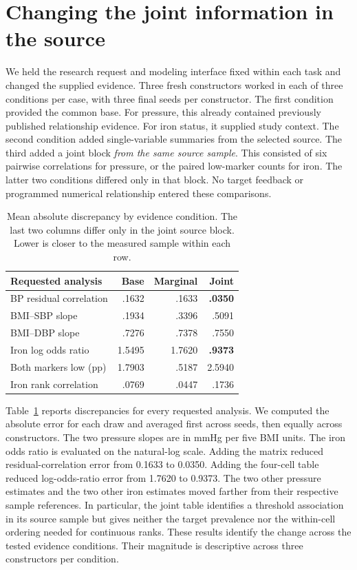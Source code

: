 \section{Changing the joint information in the source}
\label{sec:controlled}
We held the research request and modeling interface fixed within each task and changed the supplied evidence. Three fresh constructors worked in each of three conditions per case, with three final seeds per constructor. The first condition provided the common base. For pressure, this already contained previously published relationship evidence. For iron status, it supplied study context. The second condition added single-variable summaries from the selected source. The third added a joint block \emph{from the same source sample}. This consisted of six pairwise correlations for pressure, or the paired low-marker counts for iron. The latter two conditions differed only in that block. No target feedback or programmed numerical relationship entered these comparisons.

\begin{table}[t]
\caption{Mean absolute discrepancy by evidence condition. The last two columns differ only in the joint source block. Lower is closer to the measured sample within each row.}
\label{tab:evidence}
\centering
\begin{tabular}{@{}lrrr@{}}
\toprule
Requested analysis & Base & Marginal & Joint\\
\midrule
BP residual correlation & .1632 & .1633 & \textbf{.0350}\\
BMI--SBP slope & .1934 & .3396 & .5091\\
BMI--DBP slope & .7276 & .7378 & .7550\\
Iron log odds ratio & 1.5495 & 1.7620 & \textbf{.9373}\\
Both markers low (pp) & 1.7903 & .5187 & 2.5940\\
Iron rank correlation & .0769 & .0447 & .1736\\
\bottomrule
\end{tabular}
\end{table}

Table~\ref{tab:evidence} reports discrepancies for every requested analysis. We computed the absolute error for each draw and averaged first across seeds, then equally across constructors. The two pressure slopes are in mmHg per five BMI units. The iron odds ratio is evaluated on the natural-log scale. Adding the matrix reduced residual-correlation error from 0.1633 to 0.0350. Adding the four-cell table reduced log-odds-ratio error from 1.7620 to 0.9373. The two other pressure estimates and the two other iron estimates moved farther from their respective sample references. In particular, the joint table identifies a threshold association in its source sample but gives neither the target prevalence nor the within-cell ordering needed for continuous ranks. These results identify the change across the tested evidence conditions. Their magnitude is descriptive across three constructors per condition.

